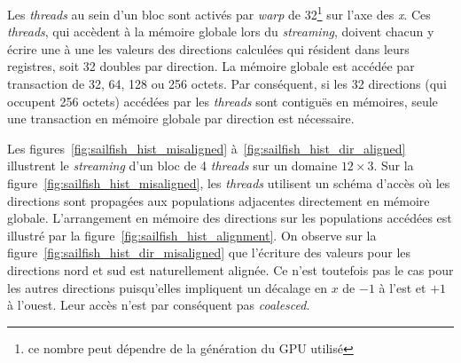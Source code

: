 Les \textit{threads} au sein d'un bloc sont activés par \textit{warp} de 32\footnote{ce nombre peut dépendre de la génération du \ac{GPU} utilisé} sur l'axe des \textit{x}. Ces \textit{threads}, qui accèdent à la mémoire globale lors du \textit{streaming}, doivent chacun y écrire une à une les valeurs des directions calculées qui résident dans leurs registres, soit 32 doubles par direction. La mémoire globale est accédée par transaction de 32, 64, 128 ou 256 octets. Par conséquent, si les 32 directions (qui occupent 256 octets) accédées par les \textit{threads} sont contiguës en mémoires, seule une transaction en mémoire globale par direction est nécessaire. 

Les figures~\ref{fig:sailfish_hist_misaligned} à~\ref{fig:sailfish_hist_dir_aligned} illustrent le \textit{streaming} d'un bloc de 4 \textit{threads} sur un domaine $12 \times 3$.
Sur la figure~\ref{fig:sailfish_hist_misaligned}, les \textit{threads} utilisent un schéma d'accès où les directions sont propagées aux populations adjacentes directement en mémoire globale. L'arrangement en mémoire des directions sur les populations accédées est illustré par la figure~\ref{fig:sailfish_hist_alignment}. On observe sur la figure~\ref{fig:sailfish_hist_dir_misaligned} que l'écriture des valeurs pour les directions nord et sud est naturellement alignée. Ce n'est toutefois pas le cas pour les autres directions puisqu'elles impliquent un décalage en $x$ de $-1$ à l'est et $+1$ à l'ouest. Leur accès n'est par conséquent pas \textit{coalesced}.
